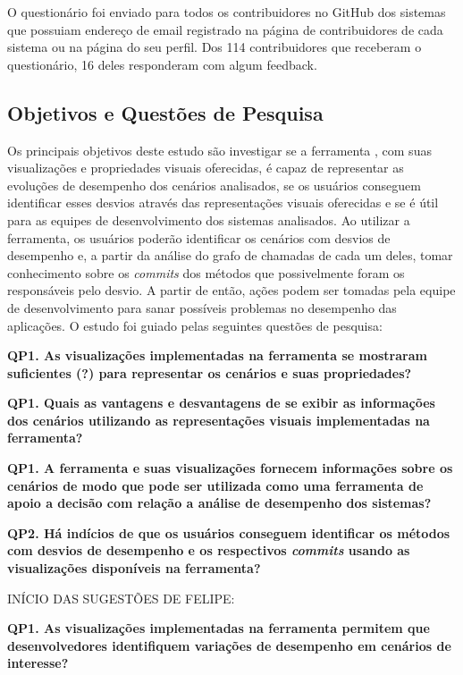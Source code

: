 O questionário foi enviado para todos os contribuidores no GitHub dos sistemas que possuiam endereço de email registrado na página de contribuidores de cada sistema ou na página do seu perfil. Dos 114 contribuidores que receberam o questionário, 16 deles responderam com algum feedback.

\subsection{Objetivos e Questões de Pesquisa} \label{subsec:avaliacao-objetivos-questoes-pesquisa}

Os principais objetivos deste estudo são investigar se a ferramenta \textit{\toolName}, com suas visualizações e propriedades visuais oferecidas, é capaz de representar as evoluções de desempenho dos cenários analisados, se os usuários conseguem identificar esses desvios através das representações visuais oferecidas e se é útil para as equipes de desenvolvimento dos sistemas analisados. Ao utilizar a ferramenta, os usuários poderão identificar os cenários com desvios de desempenho e, a partir da análise do grafo de chamadas de cada um deles, tomar conhecimento sobre os \textit{commits} dos métodos que possivelmente foram os responsáveis pelo desvio. A partir de então, ações podem ser tomadas pela equipe de desenvolvimento para sanar possíveis problemas no desempenho das aplicações. O estudo foi guiado pelas seguintes questões de pesquisa:

\textbf{QP1. As visualizações implementadas na ferramenta se mostraram suficientes (?) para representar os cenários e suas propriedades?}

\textbf{QP1. Quais as vantagens e desvantagens de se exibir as informações dos cenários utilizando as representações visuais implementadas na ferramenta?}

\textbf{QP1. A ferramenta e suas visualizações fornecem informações sobre os cenários de modo que pode ser utilizada como uma ferramenta de apoio a decisão com relação a análise de desempenho dos sistemas?}

\textbf{QP2. Há indícios de que os usuários conseguem identificar os métodos com desvios de desempenho e os respectivos \textit{commits} usando as visualizações disponíveis na ferramenta?}

{\color{red}INÍCIO DAS SUGESTÕES DE FELIPE:}

\textbf{QP1. As visualizações implementadas na ferramenta permitem que desenvolvedores identifiquem variações de desempenho em cenários de interesse?}

